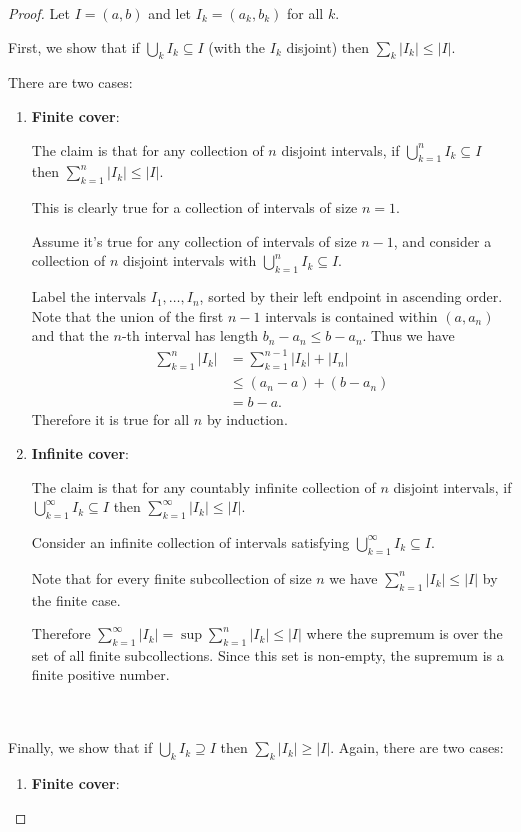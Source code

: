 \begin{proof}
  Let $I = (a, b)$ and let $I_k = (a_k, b_k)$ for all $k$.

  First, we show that if $\bigcup_k I_k \subseteq I$ (with the $I_k$ disjoint) then $\sum_k |I_k| \leq |I|$.

  There are two cases:
  \begin{enumerate}
  \item {\bf Finite cover}:

    The claim is that for any collection of $n$ disjoint intervals, if $\bigcup_{k=1}^n I_k \subseteq I$
    then $\sum_{k=1}^n |I_k| \leq |I|$.

    This is clearly true for a collection of intervals of size $n = 1$.

    Assume it's true for any collection of intervals of size $n-1$, and consider a collection of $n$ disjoint
    intervals with $\bigcup_{k=1}^n I_k \subseteq I$.

    Label the intervals $I_1, \ldots, I_n$, sorted by their left endpoint in ascending order. Note that the
    union of the first $n-1$ intervals is contained within $(a, a_n)$ and that the $n$-th interval has
    length $b_n - a_n \leq b - a_n$. Thus we have
    \begin{align*}
      \sum_{k=1}^n |I_k|
      &= \sum_{k=1}^{n-1}|I_k| + |I_n| \\
      &\leq (a_n - a) + (b - a_n) \\
      &= b - a.
    \end{align*}
    Therefore it is true for all $n$ by induction.

  \item {\bf Infinite cover}:

    The claim is that for any countably infinite collection of $n$ disjoint intervals,
    if $\bigcup_{k=1}^\infty I_k \subseteq I$ then $\sum_{k=1}^\infty |I_k| \leq |I|$.

    Consider an infinite collection of intervals satisfying $\bigcup_{k=1}^\infty I_k \subseteq I$.

    Note that for every finite subcollection of size $n$ we have $\sum_{k=1}^n |I_k| \leq |I|$ by the finite case.

    Therefore $\sum_{k=1}^\infty |I_k| = \sup \sum_{k=1}^n |I_k| \leq |I|$ where the supremum is over the set
    of all finite subcollections. Since this set is non-empty, the supremum is a finite positive number.
  \end{enumerate}
  ~\\~\\
  Finally, we show that if $\bigcup_k I_k \supseteq I$ then $\sum_k |I_k| \geq |I|$.
  Again, there are two cases:
  \begin{enumerate}
  \item {\bf Finite cover}:


\end{enumerate}
\end{proof}
